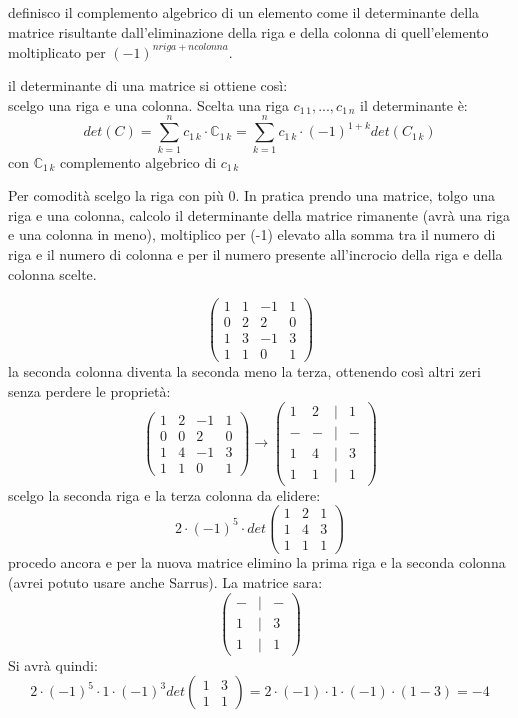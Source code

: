 \documentclass[a4paper,12pt, oneside]{book}
\begin{document}
definisco il complemento algebrico di un elemento come il determinante della matrice risultante dall'eliminazione della riga e della colonna di quell'elemento moltiplicato per $(-1)^{nriga+ ncolonna}$.
\begin{teorema}[di Laplace]
	il determinante di una matrice si ottiene così:\\
	scelgo una riga e una colonna. Scelta una riga $c_{1\,1},...,c_{1\,n}$ il determinante è:
	$$det(C)=\sum_{k=1}^n c_{1\,k}\cdot \mathbb{C}_{1\,k}=\sum_{k=1}^n c_{1\,k}\cdot (-1)^{1+k} det(C_{1\,k})$$
	con $\mathbb{C}_{1\,k}$ complemento algebrico di $c_{1\,k}$
\end{teorema}
Per comodità scelgo la riga con più 0. In pratica prendo una matrice, tolgo una riga e una colonna, calcolo il determinante della matrice rimanente (avrà una riga e una colonna in meno), moltiplico per (-1) elevato alla somma tra il numero di riga e il numero di colonna e per il numero presente all'incrocio della riga e della colonna scelte.
\begin{esempio}
	$$\left(\begin{matrix}
			1 & 1 & -1 & 1 \\
			0 & 2 & 2  & 0 \\
			1 & 3 & -1 & 3 \\
			1 & 1 & 0  & 1
		\end{matrix}\right)$$
	la seconda colonna diventa la seconda meno la terza, ottenendo così altri zeri senza perdere le proprietà:
	$$\left(\begin{matrix}
			1 & 2 & -1 & 1 \\
			0 & 0 & 2  & 0 \\
			1 & 4 & -1 & 3 \\
			1 & 1 & 0  & 1
		\end{matrix}\right) \rightarrow
		\left(\begin{matrix}
			1 & 2 & | & 1 \\
			- & - & | & - \\
			1 & 4 & | & 3 \\
			1 & 1 & | & 1
		\end{matrix}\right)$$
	scelgo la seconda riga e la terza colonna da elidere:
	$$2\cdot (-1)^5\cdot det\left(\begin{matrix}
			1 & 2 & 1 \\
			1 & 4 & 3 \\
			1 & 1 & 1
		\end{matrix}\right)
	$$
	procedo ancora e per la nuova matrice elimino la prima riga  e la seconda colonna (avrei potuto usare anche Sarrus). La matrice sara:
	$$
		\left(\begin{matrix}
			- & | & - \\
			1 & | & 3 \\
			1 & | & 1
		\end{matrix}\right)
	$$
	Si  avrà quindi:
	$$2\cdot (-1)^5\cdot 1\cdot (-1)^3 det\left(\begin{matrix}
			1 & 3 \\
			1 & 1
		\end{matrix}\right)=2\cdot (-1)\cdot 1\cdot (-1)\cdot (1-3)=-4
	$$
\end{esempio}
\end{document}
